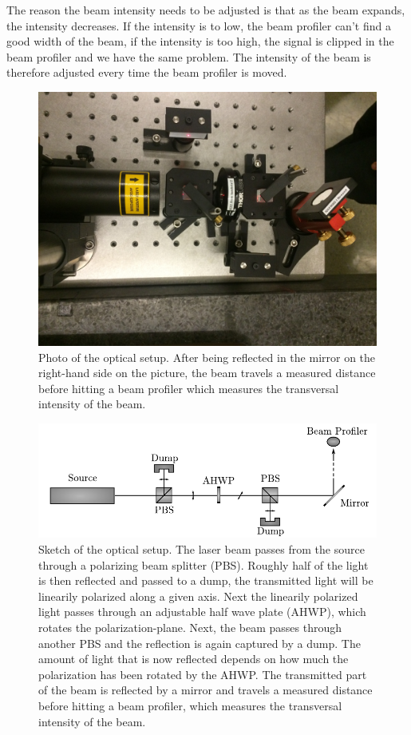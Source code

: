 \documentclass[a4paper, 11pt, notitlepage, english]{article}
\begin{document}
The reason the beam intensity needs to be adjusted is that as the beam expands, the intensity decreases. If the intensity is to low, the beam profiler can't find a good width of the beam, if the intensity is too high, the signal is clipped in the beam profiler and we have the same problem. The intensity of the beam is therefore adjusted every time the beam profiler is moved.

\begin{figure}[h!t]
\centering
\includegraphics[width=\textwidth, angle=180]{oppsett_photo}	
\caption{Photo of the optical setup. After being reflected in the mirror on the right-hand side on the picture, the beam travels a measured distance before hitting a beam profiler which measures the transversal intensity of the beam. \label{fig:setup_photo}}
\end{figure}

\begin{figure}[t!]
\centering
\includegraphics[width=\textwidth]{oppsett1}	
\caption{Sketch of the optical setup. The laser beam passes from the source through a polarizing beam splitter (PBS). Roughly half of the light is then reflected and passed to a dump, the transmitted light will be linearily polarized along a given axis. Next the linearily polarized light passes through an adjustable half wave plate (AHWP), which rotates the polarization-plane. Next, the beam passes through another PBS and the reflection is again captured by a dump. The amount of light that is now reflected depends on how much the polarization has been rotated by the AHWP. The transmitted part of the beam is reflected by a mirror and travels a measured distance before hitting a beam profiler, which measures the transversal intensity of the beam. \label{fig:setup_sketch}}
\end{figure}
\end{document}
